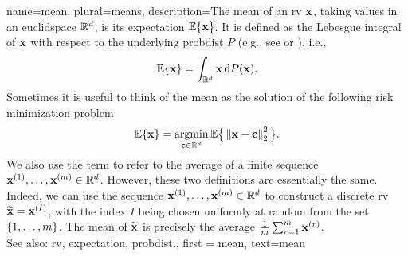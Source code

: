 {name={mean}, plural={means},
 description={The  mean of an \gls{rv} ${\bf x}$, taking 
 	values in an \gls{euclidspace} $\mathbb{R}^{d}$, is its 
 	\gls{expectation} $\mathbb{E}\{{\bf x}\}$. It is defined as the Lebesgue 
 	integral of ${\bf x}$ with respect to the underlying \gls{probdist} $P$ (e.g., see \cite{RudinBookPrinciplesMatheAnalysis} or \cite{BillingsleyProbMeasure}), i.e.,
	\[
		\mathbb{E}\{{\bf x}\} = \int_{\mathbb{R}^{d}} {\bf x} \, \mathrm{d}P({\bf x}).
	\] 
	Sometimes it is useful to think of the mean as the solution of the following \gls{risk} 
	minimization problem \cite{BertsekasProb}
	\[
		\mathbb{E}\{{\bf x}\} = \operatorname*{argmin}_{{\bf c} \in \mathbb{R}^{d}} 
		\mathbb{E} \big\{\left\Vert {{\bf x}- {\bf c}} \right\Vert_{2}^{2}\big \}.
	\] 
	We also use the term to refer to the average of a finite sequence 
	${\bf x}^{(1)}, \ldots, {\bf x}^{(m)} \in \mathbb{R}^{d}$. However, 
	these two definitions are essentially the same. Indeed, we can use the sequence 
	${\bf x}^{(1)}, \ldots, {\bf x}^{(m)} \in \mathbb{R}^{d}$ to construct a 
	discrete \gls{rv} $\widetilde{{\bf x}}={\bf x}^{(I)}$, with the index $I$ being chosen uniformly 
	at random from the set $\{1,\ldots,m\}$. The mean of $\widetilde{{\bf x}}$ is 
	precisely the average $\frac{1}{m} \sum_{r=1}^{m} {\bf x}^{(r)}$.
			\\ 
		See also: \gls{rv}, \gls{expectation}, \gls{probdist}.}, 
		first = {mean}, text={mean} 
}

